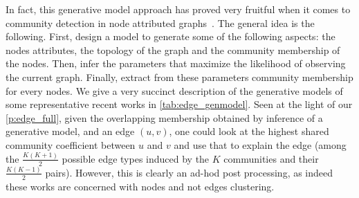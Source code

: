 In fact, this generative model approach has proved very fruitful when it comes to community
detection in node attributed graphs~\autocites{Xu2014}{Zhao2017}{Yang2013}{Kataoka2016}{Weng2016}{Newman2016}.
The general idea is the following. First, design a model to generate some of the following aspects:
the nodes attributes, the topology of the graph and the community membership of the nodes. Then,
infer the parameters that maximize the likelihood of observing the current graph. Finally, extract
from these parameters community membership for every nodes. We give a very succinct description of
the generative models of some representative recent works in \autoref{tab:edge_genmodel}. Seen at
the light of our \autoref{p:edge_full}, given the overlapping membership obtained by inference of a
generative model, and an edge $(u,v)$, one could look at the highest shared community coefficient
between $u$ and $v$ and use that to explain the edge (among the $\frac{K(K+1)}{2}$ possible edge
types induced by the $K$ communities and their $\frac{K(K-1)}{2}$ pairs). However,
this is clearly an ad-hod post processing, as indeed these works are concerned with nodes and not
edges clustering.

